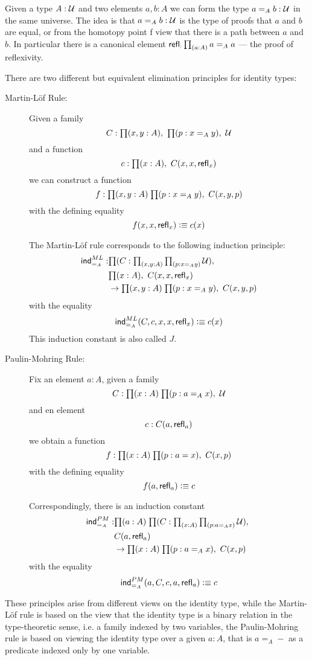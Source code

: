 Given a type $A:\mathcal{U}$ and two elements $a,b:A$ we can form the type $a=_A b:\mathcal{U}$ in the same universe. The idea is that $a=_A b:\mathcal{U}$ is the type of proofs that $a$ and $b$ are equal, or from the homotopy point f view that there is a path between $a$ and $b$. In particular there is a canonical element
$\refl : \prd{a:A} a =_A a$ --- the proof of reflexivity.

There are two different but equivalent elimination principles for
identity types:
\begin{description}
\item[Martin-L\"{o}f Rule:] 
Given a family 
\[ C : \prd{x,y:A}\prd{p:x =_A y} \UU \]
and a function
\[ c :  \prd{x:A} C(x,x,\refl{x})\]
we can construct a function
\[ f : \prd{x,y:A}{p:x =_A y} C(x,y,p) \]
with the defining equality 
\[ f(x,x,\mathsf{refl}_{x}) \vcentcolon\equiv c(x) \]

The Martin-L\"of rule corresponds to the following induction principle:
\begin{align*}
 \ind{=_A}^{ML} : & \prd{C : \prd{x,y:A}\prd{p:x =_A y} \UU}  \\
     & \prd{x:A} C(x,x,\refl{x})  \\
     & \to  \prd{x,y:A}{p:x =_A y} C(x,y,p)
\end{align*}
with the equality
\[ \mathsf{ind}_{=_A}^{ML}(C,c,x,x,\mathsf{refl}_{x}) \vcentcolon\equiv c(x) \]
This induction constant is also called $J$.

\item[Paulin-Mohring Rule:] 

Fix an element $a:A$, given a family
\[ C : \prd{x:A}{p : a =_A x} \UU \]
and en element
\[ c : C(a,\mathsf{refl}_{a}) \]
we obtain a function
\[ f : \prd{x:A}{p:a = x} C(x,p) \]
with the defining equality
\[ f(a,\mathsf{refl}_{a}) \vcentcolon\equiv c \]

Correspondingly, there is an induction constant
\begin{align*}
\ind{=_A}^{PM} : & \prd{a:A}{C : \prd{x:A}{p : a =_A x} \UU} \\
& C(a,\refl{a}) \\
& \to \prd{x:A}{p : a =_A x} C(x,p) 
\end{align*}
with the equality
\[ \mathsf{ind}_{=_A}^{PM}(a,C,c,a,\mathsf{refl}_{a}) \vcentcolon\equiv c \]
\end{description}
These principles arise from different views on the identity type,
while the Martin-L\"of rule is based on the view that the identity
type is a binary relation in the type-theoretic sense, i.e. a family
indexed by two variables, the Paulin-Mohring rule is based on viewing
the identity type over a given $a:A$, that is $a =_A -$ as a predicate
indexed only by one variable.

